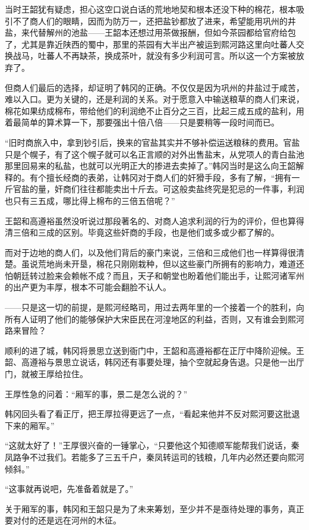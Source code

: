 当时王韶犹有疑虑，担心这空口说白话的荒地地契和根本还没下种的棉花，根本吸引不了商人们的眼睛，因而为防万一，还把盐钞都放了进来，希望能用巩州的井盐，来代替解州的池盐——王韶本还想过用茶做报酬，但如今茶园都给官府给包了，尤其是靠近陕西的蜀中，那里的茶园有大半出产被运到熙河路这里向吐蕃人交换战马，吐蕃人不再缺茶，换成茶叶，就没有多少利润可言。所以这一个方案被放弃了。

但商人们最后的选择，却证明了韩冈的正确。不仅仅是因为巩州的井盐过于咸苦，难以入口。更为关键的，还是利润的关系。对于愿意入中输送粮草的商人们来说，棉花如果纺成棉布，带给他们的利润绝不止百分之三百，比起三成五成的盐利，用着最简单的算术算一下，那要强出十倍八倍——只是要稍等一段时间而已。

“旧时商旅入中，拿到钞引后，换来的官盐其实并不够补偿运送粮秣的费用。官盐只是个幌子，有了这个幌子就可以名正言顺的对外出售盐末，从党项人的青白盐池那里回易来的私盐，也就可以光明正大的掺进去卖掉了。”韩冈当时是这么向王韶解释的。有个擅长经商的表弟，让韩冈对于商人们的奸猾手段，多有了解，“拥有一斤官盐的量，奸商们往往都能卖出十斤去。可这般卖盐终究是犯忌的一件事，利润也只有三五成，哪比得上棉布的三倍五倍呢？”

王韶和高遵裕虽然没听说过那段著名的、对商人追求利润的行为的评价，但也算得清三倍和三成的区别。毕竟这些奸商的手段，也是他们或多或少都了解的。

而对于边地的商人们，以及他们背后的豪门来说，三倍和三成他们也一样算得很清楚。虽说荒地尚未开垦，棉花只刚刚栽种，但以这些豪门所拥有的影响力，难道还怕朝廷转过脸来会赖帐不成？而且，天子和朝堂也盼着他们能出手，让熙河诸军州的出产更为丰厚，根本不可能会翻脸不认人。

——只是这一切的前提，是熙河经略司，用过去两年里的一个接着一个的胜利，向所有人证明了他们的能够保护大宋臣民在河湟地区的利益，否则，又有谁会到熙河路来冒险？

顺利的进了城，韩冈将景思立送到衙门中，王韶和高遵裕都在正厅中降阶迎候。王韶、高遵裕与景思立说话，韩冈还有事要处理，抽个空就起身告退。只是他一出厅门，就被王厚给拉住。

王厚性急的问着：“厢军的事，景二是怎么说的？”

韩冈回头看了看正厅，把王厚拉得更远了一点，“看起来他并不反对熙河要这批退下来的厢军。”

“这就太好了！”王厚很兴奋的一锤掌心，“只要他这个知德顺军能帮我们说话，秦凤路争不过我们。若能多了三五千户，秦凤转运司的钱粮，几年内必然还要向熙河倾斜。”

“这事就再说吧，先准备着就是了。”

关于厢军的事，韩冈和王韶只是为了未来筹划，至少并不是亟待处理的事务，真正要对付的还是远在河州的木征。

